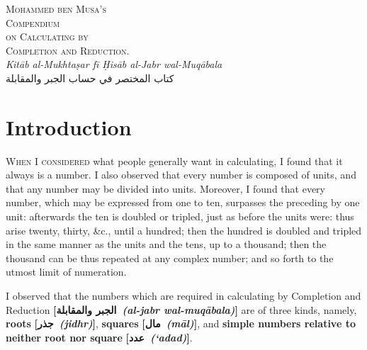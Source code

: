 \clearpage

\begin{center}
{\LARGE\scshape Mohammed ben Musa's}\\[0.5cm]
{\Large\scshape Compendium}\\[0.3cm]
{\large\scshape on Calculating by}\\[0.3cm]
{\Large\scshape Completion and Reduction.}\\[0.5cm]
{\normalsize\color{sectioncolor}
\textit{Kit\=ab al-Mukhta\d{s}ar f\=i \d{H}is\=ab al-Jabr wal-Muq\=abala}}\\[0.2cm]
{\normalsize\arabicfont\beginR كتاب المختصر في حساب الجبر والمقابلة\endR}
\end{center}

\vspace{0.5cm}

\section*{Introduction}

\lettrine{W}{hen I considered} what people generally want in calculating, I found that it always is a number. I also observed that every number is composed of units, and that any number may be divided into units. Moreover, I found that every number, which may be expressed from one to ten, surpasses the preceding by one unit: afterwards the ten is doubled or tripled, just as before the units were: thus arise twenty, thirty, \&c., until a hundred; then the hundred is doubled and tripled in the same manner as the units and the tens, up to a thousand; then the thousand can be thus repeated at any complex number; and so forth to the utmost limit of numeration.

I observed that the numbers which are required in calculating by Completion and Reduction \textbf{[\arabicfont\beginR الجبر والمقابلة\endR\ \textit{(al-jabr wal-muq\=abala)}]} are of three kinds, namely, \textbf{roots} \textbf{[\arabicfont\beginR جذر\endR\ \textit{(jidhr)}]}, \textbf{squares} \textbf{[\arabicfont\beginR مال\endR\ \textit{(m\=al)}]}, and \textbf{simple numbers relative to neither root nor square} \textbf{[\arabicfont\beginR عدد\endR\ \textit{(`adad)}]}.

